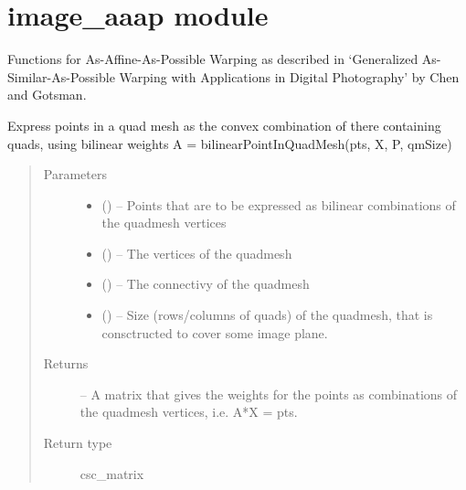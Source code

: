 \documentclass[letterpaper,10pt,english]{sphinxmanual}
\begin{document}
\chapter{image\_aaap module}
\label{\detokenize{image_aaap:image-aaap-module}}\label{\detokenize{image_aaap::doc}}\label{\detokenize{image_aaap:module-image_aaap}}
Functions for As-Affine-As-Possible Warping as described in
`Generalized As-Similar-As-Possible Warping with
Applications in Digital Photography' by Chen and Gotsman.

\begin{fulllineitems}
\label{\detokenize{image_aaap:image_aaap.bilinear_point_in_quad_mesh}}
Express points in a quad mesh as the convex combination of there
containing quads, using bilinear weights
A = bilinearPointInQuadMesh(pts, X, P, qmSize)
\begin{quote}\begin{description}
\item[{Parameters}] \leavevmode\begin{itemize}
\item {} 
 () -- Points that are to be expressed as bilinear combinations of
the quadmesh vertices

\item {} 
 () -- The vertices of the quadmesh

\item {} 
 () -- The connectivy of the quadmesh

\item {} 
 () -- Size (rows/columns of quads) of the quadmesh, that is
consctructed to cover some image plane.

\end{itemize}

\item[{Returns}] \leavevmode
{} -- A matrix that gives the weights for the points as combinations
of the quadmesh vertices, i.e. A*X = pts.

\item[{Return type}] \leavevmode
csc\_matrix

\end{description}\end{quote}

\end{fulllineitems}
\end{document}
